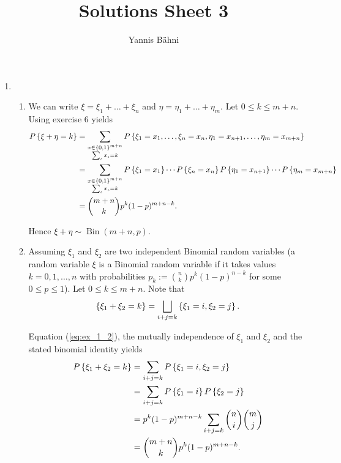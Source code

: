 
\DeclareMathOperator{\Poi}{Poi}
\DeclareMathOperator{\Bin}{Bin}

\title{Solutions Sheet 3}
\author{Yannis B\"{a}hni}
\address[Yannis B\"{a}hni]{University of Zurich, R\"{a}mistrasse 71, 8006 Zurich}


\maketitle
\thispagestyle{fancy}
\begin{enumerate}[label = \textbf{Exercise \arabic*.},wide = 0pt, itemsep=1.5ex]
	\item 
		\begin{enumerate}[label = \arabic*.,wide = 0pt, itemsep=1.5ex]
			\item We can write $\xi = \xi_1 + \dots + \xi_n$ and $\eta = \eta_1 + \dots + \eta_m$. Let $0 \leq k \leq m + n$. Using exercise $6$ \cite[217]{shiryaev2016probability} yields 
				\begin{align*}
					P\cbr[0]{\xi + \eta = k} &= \sum_{\substack{x \in \cbr[0]{0,1}^{m + n}\\\sum_\iota x_\iota = k}} P\cbr[0]{\xi_1 = x_1,\dots,\xi_n = x_n,\eta_1 =x_{n + 1},\dots,\eta_m = x_{m + n}}\\
					&= \sum_{\substack{x \in \cbr[0]{0,1}^{m + n}\\\sum_\iota x_\iota = k}} P\cbr[0]{\xi_1 = x_1}\cdots P\cbr[0]{\xi_n = x_n} P\cbr[0]{\eta_1 = x_{n + 1}}\cdots P\cbr[0]{\eta_m = x_{m + n}}\\
					&= {m + n \choose k}p^k (1 - p)^{m + n - k}.
				\end{align*}

				Hence $\xi + \eta \sim \Bin(m + n,p)$.

			\item Assuming $\xi_1$ and $\xi_2$ are two independent Binomial random variables (a random variable $\xi$ is a Binomial random variable if it takes values $k = 0,1,\dots,n$ with probabilities $p_k := {n \choose k}p^k (1 - p)^{n - k}$ for some $0 \leq p \leq 1$). Let $0 \leq k \leq m + n$. Note that 
				\begin{equation}
					\cbr[0]{\xi_1 + \xi_2 = k} = \bigsqcup_{i + j = k}\cbr[0]{\xi_1 = i, \xi_2 = j}.
					\label{eq:ex_1_2}
				\end{equation}
		
				Equation (\ref{eq:ex_1_2}), the mutually independence of $\xi_1$ and $\xi_2$ and the stated binomial identity yields
				\begin{align*}
					P\cbr[0]{\xi_1 + \xi_2 = k} &= \sum_{i + j = k}P\cbr[0]{\xi_1 = i, \xi_2 = j}\\
					&= \sum_{i + j = k} P\cbr[0]{\xi_1 = i}P\cbr[0]{\xi_2 = j}\\
					&= p^k (1 - p)^{m + n - k}\sum_{i + j = k} {n \choose i}{m \choose j}\\
					&= {m + n \choose k} p^k (1 - p)^{m + n - k}.
				\end{align*}


\end{enumerate}
\end{enumerate}
